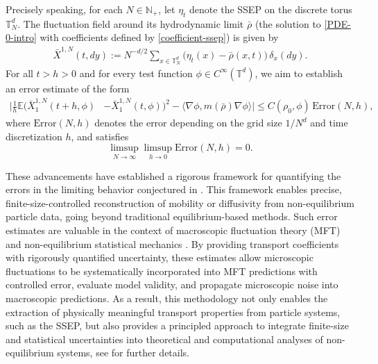 \documentclass[UTF-8,reqno]{amsart}
\numberwithin{equation}{section}
\def\leq{\leqslant}
\def\leq{\leqslant}
\begin{document}
Precisely speaking, for each $N \in \mathbb{N}_+$, let $\eta_t$ denote the SSEP on the discrete torus $\mathbb{T}^d_N$. The fluctuation field around its hydrodynamic limit $\bar{\rho}$ (the solution to \eqref{PDE-0-intro} with coefficients defined by \eqref{coefficient-ssep}) is given by
\begin{align*}
\bar{X}^{1,N}(t, dy) := N^{-d/2} \sum_{x \in \mathbb{T}^d_N} \big(\eta_t(x) - \bar{\rho}(x,t)\big)\, \delta_{x}(dy).
\end{align*}
For all $t > h > 0$ and for every test function $\phi \in C^{\infty}(\mathbb{T}^d)$, we aim to establish an error estimate of the form
\begin{align}\label{error-intro}
\Bigg|\frac{1}{h} \mathbb{E}\big(\bar{X}^{1,N}_1(t+h,\phi)& - \bar{X}^{1,N}_1(t,\phi)\big)^2 - \langle \nabla\phi, m(\bar{\rho}) \nabla\phi \rangle\Bigg| \leq C(\rho_0,\phi)\, \text{Error}(N,h),
\end{align}
where $\text{Error}(N,h)$ denotes the error depending on the grid size $1/N^d$ and time discretization $h$, and satisfies
$$
\limsup_{N \rightarrow \infty}\limsup_{h \rightarrow 0} \text{Error}(N,h) = 0.
$$

These advancements have established a rigorous framework for quantifying the errors in the limiting behavior conjectured in \cite{EDZ18}. This framework enables precise, finite-size-controlled reconstruction of mobility or diffusivity from non-equilibrium particle data, going beyond traditional equilibrium-based methods. Such error estimates are valuable in the context of macroscopic fluctuation theory (MFT) and non-equilibrium statistical mechanics \cite{BDGJL,Derrida}. By providing transport coefficients with rigorously quantified uncertainty, these estimates allow microscopic fluctuations to be systematically incorporated into MFT predictions with controlled error, evaluate model validity, and propagate microscopic noise into macroscopic predictions. As a result, this methodology not only enables the extraction of physically meaningful transport properties from particle systems, such as the SSEP, but also provides a principled approach to integrate finite-size and statistical uncertainties into theoretical and computational analyses of non-equilibrium systems, see \cite{EDZ18} for further details. 
\end{document}
